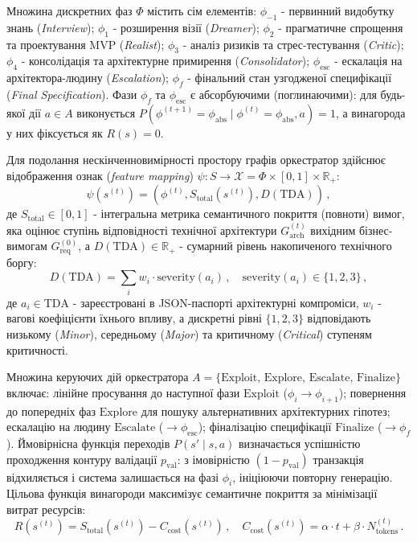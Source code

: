 \documentclass[12pt, reqno, a4paper]{amsart}
\theoremstyle{definition}
\theoremstyle{plain}
\theoremstyle{plain}
\theoremstyle{plain}
\theoremstyle{remark}
\theoremstyle{plain}
\begin{document}
{Множина дискретних фаз $\Phi$ містить сім елементів: $\phi_{-1}$ - первинний видобутку знань (\textit{Interview}); $\phi_1$ - розширення візії (\textit{Dreamer}); $\phi_2$ - прагматичне спрощення та проектування MVP (\textit{Realist}); $\phi_3$ - аналіз ризиків та стрес-тестування (\textit{Critic}); $\phi_4$ - консолідація та архітектурне примирення (\textit{Consolidator}); $\phi_{\text{esc}}$ - ескалація на архітектора-людину (\textit{Escalation}); $\phi_f$ - фінальний стан узгодженої специфікації (\textit{Final Specification}). Фази $\phi_f$ та $\phi_{\text{esc}}$ є абсорбуючими (поглинаючими): для будь-якої дії $a \in A$ виконується $P(\phi^{(t+1)} = \phi_{\text{abs}} \mid \phi^{(t)} = \phi_{\text{abs}}, a) = 1$, а винагорода у них фіксується як $R(s) = 0$.

Для подолання нескінченновимірності простору графів оркестратор здійснює відображення ознак (\textit{feature mapping}) $\psi: S \to \mathcal{X} = \Phi \times [0, 1] \times \mathbb{R}_+$:
\begin{equation}
\label{eq:feature_map}
\psi(s^{(t)}) = \left(\phi^{(t)}, S_{\text{total}}(s^{(t)}), D(\text{TDA})\right)\, ,
\end{equation}
де $S_{\text{total}} \in [0, 1]$ - інтегральна метрика семантичного покриття (повноти) вимог, яка оцінює ступінь відповідності технічної архітектури $G_{\text{arch}}^{(t)}$ вихідним бізнес-вимогам $G_{\text{req}}^{(0)}$, а $D(\text{TDA}) \in \mathbb{R}_+$ - сумарний рівень накопиченого технічного боргу:
\begin{equation*}
D(\text{TDA}) = \sum_{i} w_i \cdot \text{severity}(a_i)\, , \quad \text{severity}(a_i) \in \{1, 2, 3\}\, ,
\end{equation*}
де $a_i \in \text{TDA}$ - зареєстровані в JSON-паспорті архітектурні компроміси, $w_i$ - вагові коефіцієнти їхнього впливу, а дискретні рівні $\{1, 2, 3\}$ відповідають низькому (\textit{Minor}), середньому (\textit{Major}) та критичному (\textit{Critical}) ступеням критичності.

Множина керуючих дій оркестратора $A = \{\text{Exploit},\allowbreak\, \text{Explore},\allowbreak\, \text{Escalate},\allowbreak\, \text{Finalize}\}$ включає: лінійне просування до наступної фази $\text{Exploit}$ ($\phi_i \to \phi_{i+1}$); повернення до попередніх фаз $\text{Explore}$ для пошуку альтернативних архітектурних гіпотез; ескалацію на людину $\text{Escalate}$ ($\to \phi_{\text{esc}}$); фіналізацію специфікації $\text{Finalize}$ ($\to \phi_f$). Ймовірнісна функція переходів $P(s' \mid s, a)$ визначається успішністю проходження контуру валідації $p_{\text{val}}$: з імовірністю $(1 - p_{\text{val}})$ транзакція відхиляється і система залишається на фазі $\phi_i$, ініціюючи повторну генерацію. Цільова функція винагороди максимізує семантичне покриття за мінімізації витрат ресурсів:
\begin{equation}
\label{eq:reward}
R(s^{(t)}) = S_{\text{total}}(s^{(t)}) - C_{\text{cost}}(s^{(t)})\, , \quad C_{\text{cost}}(s^{(t)}) = \alpha \cdot t + \beta \cdot N_{\text{tokens}}^{(t)}\, .
\end{equation}

}
\end{document}
